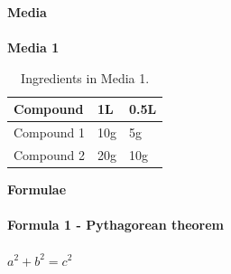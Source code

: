 \documentclass[idxtotoc,hyperref,openany]{labbook} %
\begin{document}

\newpage

\huge \textbf{Media} \\ \\

\normalsize \textbf{Media 1}\\
\begin{table}[H]
\begin{tabular}{l l l}
\toprule
\textbf{Compound} & \textbf{1L} & \textbf{0.5L}\\
\toprule
Compound 1 & 10g & 5g\\
Compound 2 & 20g & 10g\\
\bottomrule
\end{tabular}
\caption{Ingredients in Media 1.}
\label{tab:med1}
\end{table}





\newpage

\huge \textbf{Formulae} \\ \\

\normalsize \textbf{Formula 1 - Pythagorean theorem}\\ \\
$a^2 + b^2 = c^2$\\ \\




\end{document}
